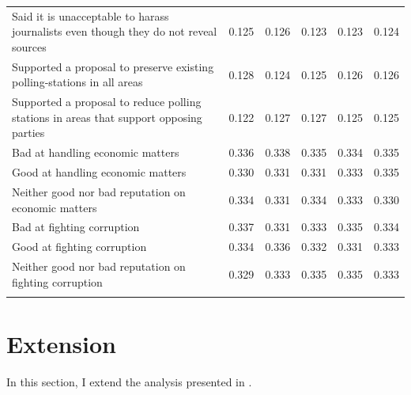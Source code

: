 \documentclass[
  12pt,
]{article}
\begin{document}
\begin{longtable}[t]{>{\raggedright\arraybackslash}p{7cm}rrrrr}
Said it is unacceptable to harass journalists even though they do not reveal sources & 0.125 & 0.126 & 0.123 & 0.123 & 0.124\\
Supported a proposal to preserve existing polling-stations in all areas & 0.128 & 0.124 & 0.125 & 0.126 & 0.126\\
Supported a proposal to reduce polling stations in areas that support opposing parties & 0.122 & 0.127 & 0.127 & 0.125 & 0.125\\
Bad at handling economic matters & 0.336 & 0.338 & 0.335 & 0.334 & 0.335\\
\addlinespace
Good at handling economic matters & 0.330 & 0.331 & 0.331 & 0.333 & 0.335\\
Neither good nor bad reputation on economic matters & 0.334 & 0.331 & 0.334 & 0.333 & 0.330\\
Bad at fighting corruption & 0.337 & 0.331 & 0.333 & 0.335 & 0.334\\
Good at fighting corruption & 0.334 & 0.336 & 0.332 & 0.331 & 0.333\\
Neither good nor bad reputation on fighting corruption & 0.329 & 0.333 & 0.335 & 0.335 & 0.333\\*
\end{longtable}

\clearpage

\hypertarget{extension}{%
\section{Extension}\label{extension}}

In this section, I extend the analysis presented in \textcite{Frederiksen2022a}.

\printbibliography
\end{document}
